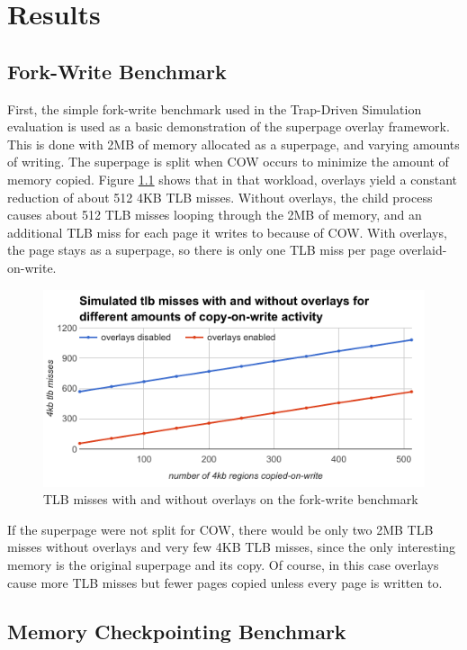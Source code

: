 \chapter{Results}

\section{Fork-Write Benchmark}

First, the simple fork-write benchmark used in the Trap-Driven Simulation evaluation is used as a basic demonstration of the superpage overlay framework. This is done with 2MB of memory allocated as a superpage, and varying amounts of writing. The superpage is split when COW occurs to minimize the amount of memory copied. Figure \ref{fig:forkwrite} shows that in that workload, overlays yield a constant reduction of about 512 4KB TLB misses. Without overlays, the child process causes about 512 TLB misses looping through the 2MB of memory, and an additional TLB miss for each page it writes to because of COW. With overlays, the page stays as a superpage, so there is only one TLB miss per page overlaid-on-write.
\begin{figure}
    \centering
    \includegraphics[width=5in]{Figures/Graph1}
    \caption{TLB misses with and without overlays on the fork-write benchmark}
    \label{fig:forkwrite}
\end{figure}

If the superpage were not split for COW, there would be only two 2MB TLB misses without overlays and very few 4KB TLB misses, since the only interesting memory is the original superpage and its copy. Of course, in this case overlays cause more TLB misses but fewer pages copied unless every page is written to.

\section{Memory Checkpointing Benchmark}

